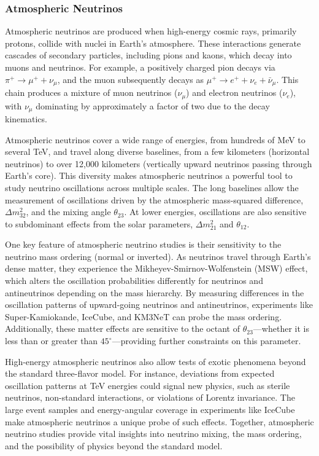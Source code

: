 \documentclass[a4paper,12pt,numbered]{article}
\begin{document}
\subsubsection{Atmospheric Neutrinos}

Atmospheric neutrinos are produced when high-energy cosmic rays, primarily protons, collide with nuclei in Earth’s atmosphere. These interactions generate cascades of secondary particles, including pions and kaons, which decay into muons and neutrinos. For example, a positively charged pion decays via $\pi^+ \to \mu^+ + \nu_\mu$, and the muon subsequently decays as $\mu^+ \to e^+ + \nu_e + \bar{\nu}_\mu$. This chain produces a mixture of muon neutrinos ($\nu_\mu$) and electron neutrinos ($\nu_e$), with $\nu_\mu$ dominating by approximately a factor of two due to the decay kinematics.

Atmospheric neutrinos cover a wide range of energies, from hundreds of MeV to several TeV, and travel along diverse baselines, from a few kilometers (horizontal neutrinos) to over 12,000 kilometers (vertically upward neutrinos passing through Earth's core). This diversity makes atmospheric neutrinos a powerful tool to study neutrino oscillations across multiple scales. The long baselines allow the measurement of oscillations driven by the atmospheric mass-squared difference, $\Delta m^2_{32}$, and the mixing angle $\theta_{23}$. At lower energies, oscillations are also sensitive to subdominant effects from the solar parameters, $\Delta m^2_{21}$ and $\theta_{12}$.

One key feature of atmospheric neutrino studies is their sensitivity to the neutrino mass ordering (normal or inverted). As neutrinos travel through Earth's dense matter, they experience the Mikheyev-Smirnov-Wolfenstein (MSW) effect, which alters the oscillation probabilities differently for neutrinos and antineutrinos depending on the mass hierarchy. By measuring differences in the oscillation patterns of upward-going neutrinos and antineutrinos, experiments like Super-Kamiokande, IceCube, and KM3NeT can probe the mass ordering. Additionally, these matter effects are sensitive to the octant of $\theta_{23}$—whether it is less than or greater than $45^\circ$—providing further constraints on this parameter.

High-energy atmospheric neutrinos also allow tests of exotic phenomena beyond the standard three-flavor model. For instance, deviations from expected oscillation patterns at TeV energies could signal new physics, such as sterile neutrinos, non-standard interactions, or violations of Lorentz invariance. The large event samples and energy-angular coverage in experiments like IceCube make atmospheric neutrinos a unique probe of such effects. Together, atmospheric neutrino studies provide vital insights into neutrino mixing, the mass ordering, and the possibility of physics beyond the standard model.
\end{document}
